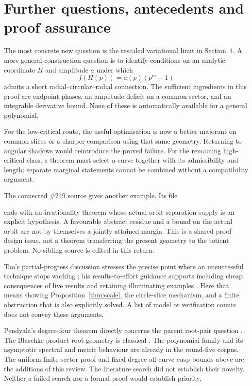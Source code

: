 \documentclass[11pt,a4paper]{article}
\theoremstyle{remark}\newtheorem{remark}[theorem]{Remark}
\begin{document}
\section{Further questions, antecedents and proof assurance}

The most concrete new question is the rescaled variational limit in
Section~4. A more general construction question is to identify conditions on
an analytic coordinate $H$ and amplitude $a$ under which
\[
 f(H(p))=a(p)(p^m-1)
\]
admits a short radial--circular--radial connection. The sufficient ingredients
in this proof are endpoint phases, an amplitude deficit on a common sector,
and an integrable derivative bound. None of these is automatically available
for a general polynomial.

For the low-critical route, the useful optimisation is now a better
majorant on common slices or a sharper comparison using that same geometry.
Returning to angular shadows would reintroduce the proved failure.
For the remaining high-critical class, a theorem must select a curve together
with its admissibility and length; separate marginal statements cannot be
combined without a compatibility argument.

The connected \#249 source gives another example. Its file
\begin{quote}\small{}\end{quote}
ends with an irrationality theorem whose actual-orbit separation supply is
an explicit hypothesis. A
favourable abstract residue and a bound on the actual orbit are not by
themselves a jointly attained margin. This is a shared proof-design issue,
not a theorem transferring the present geometry to the totient problem.
No sibling source is edited in this return.

Tao's partial-progress discussion stresses the precise point where an
unsuccessful technique stops working \cite{taopartial}; his
results-to-effort guidance supports including cheap consequences of live
results and retaining illuminating examples \cite{taoeffort}.
Here that means showing Proposition~\ref{thm:scale}, the circle-slice
mechanism, and a finite obstruction that is also explicitly solved.
A list of model or verification counts does not convey these arguments.

Pendyala's degree-four theorem directly concerns the parent root-pair
question \cite{pendyala}. The Blaschke-product root geometry is classical
\cite{blaschke}. The polynomial family and its asymptotic spectral and
metric behaviour are already in the round-five corpus.
The uniform finite sector proof and fixed-degree all-curve cusp bounds above
are the additions of this review. The literature search did not establish
their novelty. Neither a failed search nor a formal proof would establish
priority.
\end{document}
